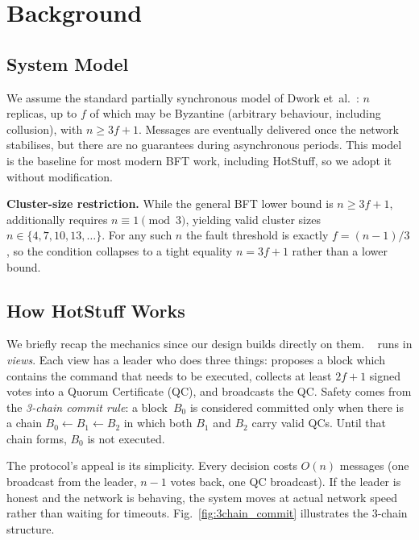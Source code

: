 \chapter{Background}
\label{sec:background}

\section{System Model}

We assume the standard partially synchronous model of Dwork
et~al.~\cite{dls1988}: $n$ replicas, up to $f$ of which may be
Byzantine (arbitrary behaviour, including collusion), with
$n \ge 3f{+}1$.  Messages are eventually delivered once the network
stabilises, but there are no guarantees during asynchronous periods.
This model is the baseline for most modern BFT work, including
HotStuff, so we adopt it without modification.

\smallskip\noindent\textbf{Cluster-size restriction.}\quad
While the general BFT lower bound is $n \ge 3f{+}1$,
\persisthotstuff{} additionally requires $n \equiv 1 \pmod{3}$,
yielding valid cluster sizes $n \in \{4, 7, 10, 13, \ldots\}$.  For any
such $n$ the fault threshold is exactly $f = (n{-}1)/3$, so the
condition collapses to a tight equality $n = 3f{+}1$ rather than a
lower bound.

\section{How HotStuff Works}

We briefly recap the mechanics since our design builds directly on
them.  \hotstuff{}~\cite{hotstuff2019} runs in \emph{views}.  Each
view has a leader who does three things: proposes a block which
contains the command that needs to be executed, collects at least
$2f{+}1$ signed votes into a Quorum Certificate (QC), and broadcasts
the QC.  Safety comes from the \emph{3-chain commit rule}: a
block~$B_0$ is considered committed only when there is a chain
$B_0 \leftarrow B_1 \leftarrow B_2$ in which both $B_1$ and $B_2$
carry valid QCs.  Until that chain forms, $B_0$ is not executed.

The protocol's appeal is its simplicity.  Every decision costs $O(n)$
messages (one broadcast from the leader, $n{-}1$ votes back, one QC
broadcast).  If the leader is honest and the network is behaving, the
system moves at actual network speed rather than waiting for timeouts.
Fig.~\ref{fig:3chain_commit} illustrates the 3-chain structure.

